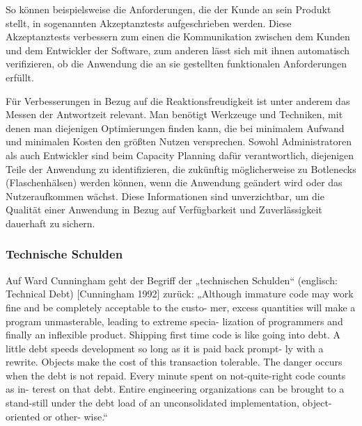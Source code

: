 So können beispielsweise die Anforderungen, die der Kunde an sein Produkt stellt, in sogenannten Akzeptanztests aufgeschrieben werden. Diese Akzeptanztests verbessern zum
einen die Kommunikation zwischen dem Kunden und dem Entwickler der Software, zum anderen lässt sich mit ihnen automatisch verifizieren, ob die Anwendung die an sie gestellten funktionalen Anforderungen erfüllt.

Für Verbesserungen in Bezug auf die Reaktionsfreudigkeit ist unter anderem das Messen der Antwortzeit relevant. Man benötigt Werkzeuge und Techniken, mit denen man diejenigen 
Optimierungen finden kann, die bei minimalem Aufwand und minimalen Kosten den größten Nutzen versprechen. Sowohl Administratoren als auch Entwickler sind beim Capacity Planning 
dafür verantwortlich, diejenigen Teile der Anwendung zu identifizieren, die zukünftig möglicherweise zu Botlenecks (Flaschenhälsen) werden können, wenn die Anwendung geändert wird 
oder das Nutzeraufkommen wächst. Diese Informationen sind unverzichtbar, um die Qualität einer Anwendung in Bezug auf Verfügbarkeit und Zuverlässigkeit dauerhaft zu sichern.


\subsubsection{Technische Schulden}
Auf Ward Cunningham geht der Begriff der „technischen Schulden“ (englisch: Technical Debt) [Cunningham 1992] zurück:
„Although immature code may work fine and be completely acceptable to the custo-
mer, excess quantities will make a program unmasterable, leading to extreme specia-
lization of programmers and finally an inflexible product. Shipping first time code is
like going into debt. A little debt speeds development so long as it is paid back prompt-
ly with a rewrite. Objects make the cost of this transaction tolerable. The danger occurs
when the debt is not repaid. Every minute spent on not-quite-right code counts as in-
terest on that debt. Entire engineering organizations can be brought to a stand-still
under the debt load of an unconsolidated implementation, object-oriented or other-
wise.“


